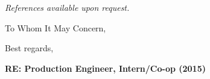 \documentclass[11pt,a4paper,sans]{moderncv}        %
\begin{document}
\begin{center}
\textit{References available upon request.}
\end{center}


\nocite{*}



\clearpage
\date{January 24th, 2016}
\opening{To Whom It May Concern,}
\closing{Best regards,}
\makelettertitle

\textbf{RE: Production Engineer, Intern/Co-op (2015)}
\end{document}
